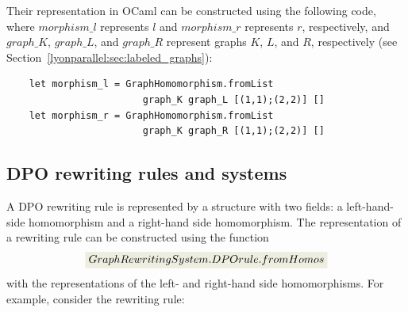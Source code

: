\noindent Their representation in OCaml can be constructed using the following code, where \colorbox{Ivory2}{$morphism\_l$} represents $l$ and \colorbox{Ivory2}{$morphism\_r$} represents $r$, respectively, and \colorbox{Ivory2}{$graph\_K$}, \colorbox{Ivory2}{$graph\_L$}, and \colorbox{Ivory2}{$graph\_R$} represent graphs $K$, $L$, and $R$, respectively (see Section~\ref{lyonparallel:sec:labeled_graphs}):
\begin{lstlisting}
    let morphism_l = GraphHomomorphism.fromList 
                        graph_K graph_L [(1,1);(2,2)] []
    let morphism_r = GraphHomomorphism.fromList
                        graph_K graph_R [(1,1);(2,2)] []
\end{lstlisting}

\subsection{DPO rewriting rules and systems}
A DPO rewriting rule is represented by a structure with two fields: a left-hand-side homomorphism and a right-hand side homomorphism. The representation of a rewriting rule can be constructed using the function
 $$\colorbox{Ivory2}{$GraphRewritingSystem.DPOrule.fromHomos$}$$
with the representations of the left- and right-hand side homomorphisms.
For example, 
consider the rewriting rule:
  \begin{center}
    \end{center}
